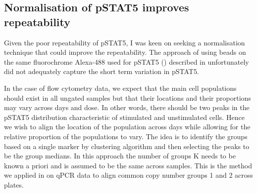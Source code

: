 \subsection{Normalisation of pSTAT5 improves repeatability}


Given the poor repeatability of pSTAT5, I was keen on seeking a normalisation technique that could improve the repeatability.
The approach of using beads on the same fluorochrome Alexa-488 used for pSTAT5 () described in 
unfortunately did not adequately capture the short term variation in pSTAT5.

In the case of flow cytometry data, we expect that the main cell populations should exist in all ungated samples but that their locations and their
proportions may vary across days and  dose.
In other words, there should be two peaks in the pSTAT5 distribution characteristic of stimulated and unstimulated cells.
Hence we wish to align the location of the population across days while allowing for the relative proportion of the populations to vary.  
The idea is to identify the groups based on a single marker by clustering algorithm and then selecting the peaks to be the group medians.
In this approach the number of groups K needs to be known a priori and is assumed to be the same across samples.
This is the method we applied in  on qPCR data to align common copy number groups 1 and 2 across plates.


